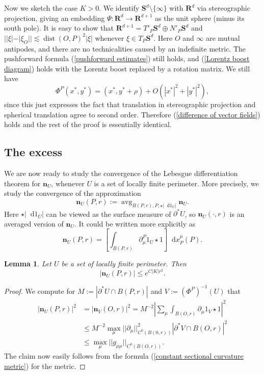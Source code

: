 \documentclass[reqno,11pt]{amsart}
\newcommand{\RR}{\mathbf{R}}
\newcommand{\Sph}{\mathbf S}
\DeclareMathOperator{\avg}{avg}
\newcommand*\dif{\mathop{}\!\mathrm{d}}
\DeclareMathOperator{\dist}{dist}
\newcommand{\normal}{\mathbf n}
\newtheorem{lemma}[theorem]{Lemma}
\theoremstyle{definition}
\numberwithin{equation}{section}
\begin{document}
Now we sketch the case $K > 0$.
We identify $\Sph^d \setminus \{\infty\}$ with $\RR^d$ via stereographic projection, giving an embedding $\Psi: \RR^d \to \RR^{d + 1}$ as the unit sphere (minus its south pole).
It is easy to show that $\RR^{d + 1} = T'_P \Sph^d \oplus N'_P \Sph^d$ and $||\xi| - |\xi_O|| \lesssim \dist(O, P)^2 |\xi|$ whenever $\xi \in T_P \Sph^d$.
Here $O$ and $\infty$ are mutual antipodes, and there are no technicalities caused by an indefinite metric.
The pushforward formula (\ref{pushforward estimates}) still holds, and (\ref{Lorentz boost diagram}) holds with the Lorentz boost replaced by a rotation matrix.
We still have
$$\Phi^P(x^*, y^*) = (x^*, y^* + \rho) + O(|x^*|^2 + |y^*|^2),$$
since this just expresses the fact that translation in stereographic projection and spherical translation agree to second order.
Therefore (\ref{difference of vector fields}) holds and the rest of the proof is essentially identical.


\subsection{The excess}
We are now ready to study the convergence of the Lebesgue differentiation theorem for $\normal_U$, whenever $U$ is a set of locally finite perimeter.
More precisely, we study the convergence of the approximation
$$\normal_U(P, r) := \avg_{B(P, r), P, \star |\dif 1_U|} \normal_U.$$
Here $\star |\dif 1_U|$ can be viewed as the surface measure of $\partial^* U$, so $\normal_U(\cdot, r)$ is an averaged version of $\normal_U$.
It could be written more explicitly as
$$\normal_U(P, r) = \left[\int_{B(P, r)} \partial_\mu^P 1_U \star 1\right] \dif x_P^\mu(P).$$

\begin{lemma}\label{gauge invariance of the normal}
Let $U$ be a set of locally finite perimeter. Then
$$|\normal_U(P, r)| \leq e^{C|K|r^2}.$$
\end{lemma}
\begin{proof}
We compute for $M := |\partial^* U \cap B(P, r)|$ and $V := (\Phi^P)^{-1}(U)$ that
\begin{align*}
|\normal_U(P, r)|^2 &= |\normal_V(O, r)|^2 = M^{-2} \left|\sum_\mu \int_{B(O, r)} \partial_\mu 1_V \star 1\right|^2 \\
&\leq M^{-2} \max_\mu ||\partial_\mu||_{C^0(B(0, r))}^2 |\partial^* V \cap B(O, r)|^2 \\
&\leq \max_\mu ||g_{\mu\mu}||_{C^0(B(O, r))}.
\end{align*}
The claim now easily follows from the formula (\ref{constant sectional curvature metric}) for the metric.
\end{proof}
\end{document}
